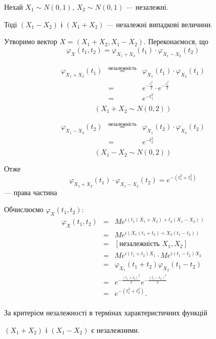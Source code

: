 \begin{example}
    Нехай $X_1 \sim N(0, 1)$, $X_2 \sim N(0, 1)$ --- незалежні.
    
    Тоді $(X_1 - X_2)$ і $(X_1 + X_2)$ --- незалежні випадкові величини.

    Утворимо вектор $X = (X_1 + X_2, X_1 - X_2)$.
    Переконаємося, що 
    $$\varphi_{X}(t_1, t_2)
    = \varphi_{X_1 + X_2}(t_1) \cdot \varphi_{X_1 - X_2}(t_2)$$
    
    $$\begin{array}{rcl}
        \varphi_{X_1 + X_2}(t_1) & \stackrel{\text{незалежність}}{=} 
            & \varphi_{X_1}(t_1) \cdot \varphi_{X_2}(t_1) \\
         & = & e^{-\frac{t_1^2}{2}} \cdot e^{-\frac{t_1^2}{2}} \\
         & = & e^{- t_1^2} \\
    \end{array}$$
    $$(X_1 + X_2 \sim N(0, 2))$$

    $$\begin{array}{rcl}
        \varphi_{X_1 - X_2}(t_2) & \stackrel{\text{незалежність}}{=} 
            & \varphi_{X_1}(t_2) \cdot \varphi_{X_2}(t_2) \\
         & = & e^{-t_2^2} \\
    \end{array}$$
    $$(X_1 - X_2 \sim N(0, 2))$$

    Отже 
    $$\varphi_{X_1 + X_2}(t_1) \cdot \varphi_{X_1 - X_2}(t_2)
    = e^{-(t_1^2 + t_2^2)}$$
    --- права частина

    Обчислюємо $\varphi_X(t_1, t_2)$:
    $$\begin{array}{rcl}
        \varphi_X(t_1, t_2)
        & = & M e^{i (t_1(X_1 + X_2) + t_2(X_1 - X_2))} \\
        & = & M e^{i (X_1(t_1 + t_2) + X_2(t_1 - t_2))} \\
        & = & [\text{незалежність } X_1, X_2]  \\
        & = & M e^{i(t_1 + t_2)X_1} \cdot M e^{i(t_1 - t_2)X_2} \\
        & = & \varphi_{X_1}(t_1 + t_2) \varphi_{X_2}(t_1 - t_2) \\
        & = & e^{-\frac{(t_1 + t_2)^2}{2}} e^{-\frac{(t_1 - t_2)^2}{2}} \\
        & = & e^{-(t_1^2 + t_2^2)}.\\
    \end{array}$$

    За критерієм незалежності в термінах характеристичних функцій

    $(X_1 + X_2)$ і $(X_1 - X_2)$ є незалежними.
\end{example}


